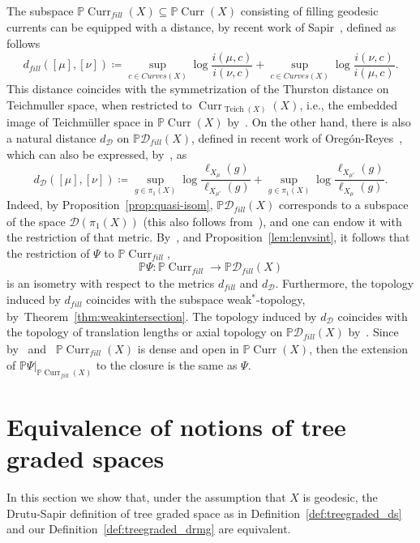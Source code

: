 \documentclass[12pt,article]{amsart}
\numberwithin{equation}{section}
\numberwithin{figure}{section}
\theoremstyle{definition}
\theoremstyle{plain}
\DeclareMathOperator{\Curr}{Curr}
\DeclareMathOperator{\Teich}{Teich}
\newcommand{\Curves}{\mathit{Curves}}
\begin{document}
The subspace $\mathbb{P}\Curr_{\mathit{fill}}(X) \subseteq \mathbb{P}\Curr(X)$ consisting of filling geodesic currents can be equipped with a distance, by recent work of Sapir~\cite{Sap22:ExtensionThurston}, defined as follows
\[
d_{\mathit{fill}}([\mu],[\nu]) \coloneqq \sup_{c \in \Curves(X)} \log \frac{i(\mu,c)}{i(\nu,c)} + \sup_{c \in \Curves(X)} \log \frac{i(\nu,c)}{i(\mu,c)}.
\]
This distance coincides with the symmetrization of the Thurston distance on Teichmuller space, when restricted to $\Curr_{\Teich(X)}(X)$, i.e., the embedded image of Teichm\"uller space in $\mathbb{P}\Curr(X)$ by~\cite[Theorem~8.5]{Th98:ThurstonMetric}.
On the other hand, there is also a natural distance 
$d_{\mathcal{D}}$ on $\mathbb{P}\mathcal{D}_{\mathit{fill}}(X)$, defined in recent work of Oreg\'on-Reyes~\cite[Definition~1.2]{OR22:SpaceMetric}, which can also be expressed, by~\cite[Lemma~3.5]{OR22:SpaceMetric}, as
\[
d_{\mathcal{D}}([\mu],[\nu]) \coloneqq \sup_{g \in \pi_1(X)} \log \frac{\ell_{X_\mu}(g)}{\ell_{X_{\mu'}}(g)} + \sup_{g \in \pi_1(X)} \log \frac{\ell_{X_{\mu'}}(g)}{\ell_{X_{\mu}}(g)}.
\]
Indeed, by Proposition~\ref{prop:quasi-isom}, $\mathbb{P}\mathcal{D}_{\mathit{fill}}(X)$ corresponds to a subspace of the space $\mathcal{D}(\pi_1(X))$ (this also follows from~\cite[Theorem~1.11]{COR22:Manhattan}), and one can endow it with the restriction of that metric.
By~\cite[Lemma~3.5]{OR22:SpaceMetric}, and Proposition~\ref{lem:lenvsint}, it follows that the restriction of $\Psi$ to $\mathbb{P}\Curr_{\mathit{fill}}$,
\[
\mathbb{P}\Psi \colon \mathbb{P}\Curr_{\mathit{fill}} \to \mathbb{P}\mathcal{D}_{\mathit{fill}}(X)
\]
is an isometry with respect to the metrics $d_{\mathit{fill}}$ and $d_{\mathcal{D}}$.
Furthermore, the topology induced by $d_{\mathit{fill}}$ coincides with the subspace weak$^*$-topology, by~Theorem~\ref{thm:weakintersection}. The topology induced by $d_{\mathcal{D}}$ coincides with the topology of translation lengths or axial topology on $\mathbb{P}\mathcal{D}_{\mathit{fill}}(X)$ 
by~\cite[Lemma~3.5]{OR22:SpaceMetric}.
Since by~\cite[Lemma~3.5]{EM18:ErgodicGeodesicCurrents} and~\cite[Corollary~3.8]{EM18:ErgodicGeodesicCurrents} $\mathbb{P}\Curr_{\mathit{fill}}(X)$ is dense and open in $\mathbb{P}\Curr(X)$, then the extension of $\mathbb{P}\Psi|_{\mathbb{P}\Curr_{\mathit{fill}}(X)}$ to the closure is the same as $\Psi$.

\appendix
\section{Equivalence of notions of tree graded spaces}
\label{sec:treegraded}
In this section we show that, under the assumption that $X$ is geodesic, the Drutu-Sapir definition of tree graded space as in Definition~\ref{def:treegraded_ds} and our Definition~\ref{def:treegraded_drmg} are equivalent.
\end{document}
